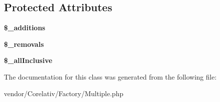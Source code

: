 \subsection*{Protected Attributes}
\begin{DoxyCompactItemize}
\item 
\hypertarget{classMultiple_adce710a51b3bf0b4a7f5af77edb8c84e}{
{\bfseries \$\_\-additions}}
\label{classMultiple_adce710a51b3bf0b4a7f5af77edb8c84e}

\item 
\hypertarget{classMultiple_ada9b96a2f04ee7f9ad0c6d9503e36fea}{
{\bfseries \$\_\-removals}}
\label{classMultiple_ada9b96a2f04ee7f9ad0c6d9503e36fea}

\item 
\hypertarget{classMultiple_a7a00c8285baf13c3e95dfc4756e2b738}{
{\bfseries \$\_\-allInclusive}}
\label{classMultiple_a7a00c8285baf13c3e95dfc4756e2b738}

\end{DoxyCompactItemize}


The documentation for this class was generated from the following file:\begin{DoxyCompactItemize}
\item 
vendor/Corelativ/Factory/Multiple.php\end{DoxyCompactItemize}
